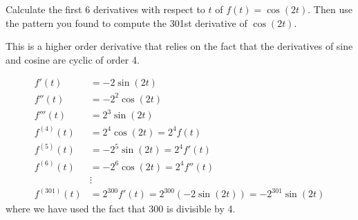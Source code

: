 \documentclass{ximera}
\author{Emma Smith Zbarsky}
\begin{document}
\begin{exercise}

Calculate the first 6 derivatives with respect to $t$ of
$f(t) = \cos(2t)$. Then use the pattern you found to compute the 301st
derivative of $\cos(2t).$


\begin{hint}
This is a higher order derivative that relies on the fact that the
derivatives of sine and cosine are cyclic of order 4.
\end{hint}


\begin{hint}
\begin{align*}
f'(t) &= -2\sin(2t) \\
f''(t) &= -2^2\cos(2t) \\
f'''(t) &= 2^3\sin(2t) \\
f^{(4)}(t) &= 2^4\cos(2t) = 2^4 f(t)\\
f^{(5)}(t) &= -2^5\sin(2t) = 2^4 f'(t) \\
f^{(6)}(t) &= -2^6\cos(2t) = 2^4 f''(t) \\
& \vdots \\
f^{(301)}(t) &= 2^{300}f'(t) = 2^{300}(-2\sin(2t)) = -2^{301}\sin(2t)
\end{align*} where we have used the fact that 300 is divisible by 4.
\end{hint}


\begin{multipleChoice}
\end{multipleChoice}

\end{exercise}
\end{document}
